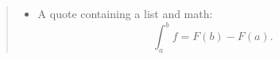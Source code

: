 \documentclass{article}
\begin{document}
\begin{quote}
  \begin{itemize}
    \item A quote containing a list and math:
    \begin{equation*}
      \int_a^b f = F(b)-F(a).
    \end{equation*}
  \end{itemize}
\end{quote}
\end{document}
